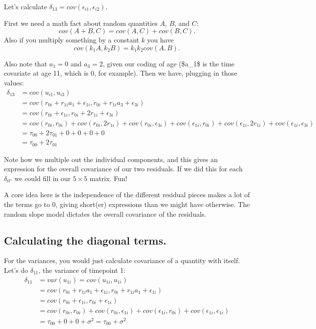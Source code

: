 \documentclass[
  letterpaper,
  DIV=11,
  numbers=noendperiod]{scrreprt}
\begin{document}
Let's calculate \(\delta_{13} = cov( \epsilon_{i1}, \epsilon_{i2} )\).

First we need a math fact about random quantities \(A\), \(B\), and
\(C\): \[cov( A + B, C ) = cov( A, C ) + cov( B, C ) .\] Also if you
multiply something by a constant \(k\) you have
\[cov( k_1 A, k_2 B ) = k_1 k_2 cov( A, B ) .\]

Also note that \(a_1 = 0\) and \(a_3 = 2\), given our coding of age
(\$a\_1\$ is the time covariate at age 11, which is 0, for example).
Then we have, plugging in those values: \[\begin{aligned}
\delta_{13} &= cov( u_{i1}, u_{i3} ) \\
   &= cov(  r_{0i} + r_{1i} a_1 + \epsilon_{1i},  r_{0i} + r_{1i} a_3 + \epsilon_{3i} ) \\
   &= cov(  r_{0i}  + \epsilon_{1i},  r_{0i} + 2 r_{1i} + \epsilon_{3i} ) \\
   &= cov(  r_{0i}, r_{0i} ) + cov( r_{0i}, 2 r_{1i} ) + cov( r_{0i}, \epsilon_{3i} ) + cov( \epsilon_{1i}, r_{0i}) + cov( \epsilon_{1i}, 2 r_{1i} )  + cov( \epsilon_{1i}, \epsilon_{3i}) \\
   &= \tau_{00} + 2\tau_{01} + 0 + 0 + 0 + 0 \\
   &= \tau_{00} + 2\tau_{01} 
\end{aligned}\]

Note how we multiple out the individual components, and this gives an
expression for the overall covariance of our two residuals. If we did
this for each \(\delta_{tt'}\) we could fill in our \(5 \times 5\)
matrix. Fun!

A core idea here is the independence of the different residual pieces
makes a lot of the terms go to 0, giving short(er) expressions than we
might have otherwise. The random slope model dictates the overall
covariance of the residuals.

\subsection{Calculating the diagonal
terms.}\label{calculating-the-diagonal-terms.}

For the variances, you would just calculate covariance of a quantity
with itself. Let's do \(\delta_{11}\), the variance of timepoint 1:
\[\begin{aligned}
\delta_{11} &= var( u_{1i} ) = cov( u_{1i}, u_{1i} ) \\
   &= cov(  r_{0i} + r_{1i} a_1 + \epsilon_{1i},  r_{0i} + r_{1i} a_1 + \epsilon_{1i} ) \\
   &= cov(  r_{0i}  + \epsilon_{1i},  r_{0i} + \epsilon_{1i} ) \\
   &= cov(  r_{0i}, r_{0i} ) + cov( r_{0i},  \epsilon_{1i} ) + cov( \epsilon_{1i}, r_{0i}) + cov( \epsilon_{1i},\epsilon_{1i} )  \\
   &= \tau_{00} + 0 + 0 + \sigma^2 =  \tau_{00} + \sigma^2
\end{aligned}\]
\end{document}
